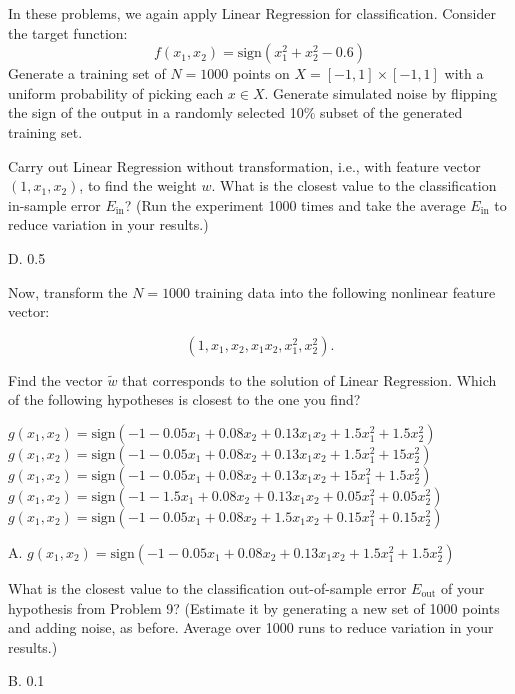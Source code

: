 \documentclass[answers]{exam}
\begin{document}
In these problems, we again apply Linear Regression for classification. Consider 
the target function:
\[
f(x_1, x_2) = \text{sign}(x_1^2 + x_2^2 - 0.6)
\]
Generate a training set of $N = 1000$ points on $X = [-1, 1] \times [-1, 1]$ with 
a uniform probability of picking each $x \in X$. Generate simulated noise by 
flipping the sign of the output in a randomly selected 10\% subset of the generated 
training set.

\begin{questions}
\setcounter{question}{7}

\question Carry out Linear Regression without transformation, i.e., with feature 
vector $(1, x_1, x_2)$, to find the weight $w$. What is the closest value to the 
classification in-sample error $E_{\text{in}}$? (Run the experiment 1000 times and 
take the average $E_{\text{in}}$ to reduce variation in your results.)
\begin{choices}
\end{choices}

\begin{solution}
    D. 0.5
\end{solution}

\question Now, transform the $N = 1000$ training data into the following nonlinear 
feature vector: 

\[
(1, x_1, x_2, x_1 x_2, x_1^2, x_2^2)
.\] 

Find the vector $\tilde{w}$ that corresponds to the solution of Linear Regression. 
Which of the following hypotheses is closest to the one you find?
\begin{choices}
    \choice $g(x_1, x_2) = \text{sign}(-1 - 0.05x_1 + 0.08x_2 + 0.13x_1 x_2 + 
    1.5x_1^2 + 1.5x_2^2)$
    \choice $g(x_1, x_2) = \text{sign}(-1 - 0.05x_1 + 0.08x_2 + 0.13x_1 x_2 + 
    1.5x_1^2 + 15x_2^2)$
    \choice $g(x_1, x_2) = \text{sign}(-1 - 0.05x_1 + 0.08x_2 + 0.13x_1 x_2 + 
    15x_1^2 + 1.5x_2^2)$
    \choice $g(x_1, x_2) = \text{sign}(-1 - 1.5x_1 + 0.08x_2 + 0.13x_1 x_2 + 
    0.05x_1^2 + 0.05x_2^2)$
    \choice $g(x_1, x_2) = \text{sign}(-1 - 0.05x_1 + 0.08x_2 + 1.5x_1 x_2 + 
    0.15x_1^2 + 0.15x_2^2)$
\end{choices}

\begin{solution}
    A. $g(x_1, x_2) = \text{sign}(-1 - 0.05x_1 + 0.08x_2 + 0.13x_1 x_2 + 
    1.5x_1^2 + 1.5x_2^2)$
\end{solution}

\question What is the closest value to the classification out-of-sample error 
$E_{\text{out}}$ of your hypothesis from Problem 9? (Estimate it by generating 
a new set of 1000 points and adding noise, as before. Average over 1000 runs to 
reduce variation in your results.)
\begin{choices}
\end{choices}

\begin{solution}
    B. 0.1
\end{solution}

\end{questions}
\end{document}
